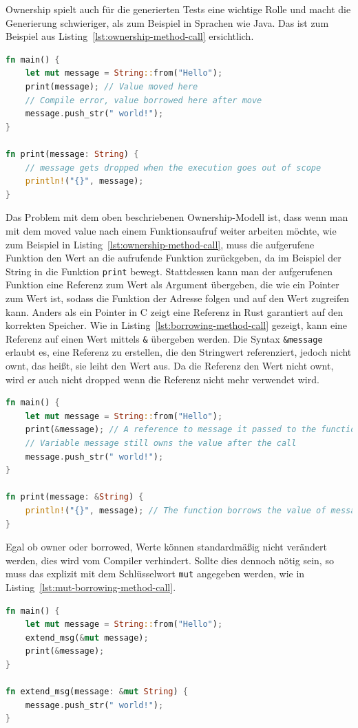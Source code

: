 \documentclass{article}
\begin{document}
Ownership spielt auch für die generierten Tests eine wichtige Rolle und macht die Generierung schwieriger, als zum Beispiel in Sprachen wie Java. Das ist zum Beispiel aus Listing~\ref{lst:ownership-method-call} ersichtlich.
\begin{lstlisting}[language=Rust, style=boxed, caption=Transferring the ownership to a method, label=lst:ownership-method-call]
fn main() {
    let mut message = String::from("Hello");
    print(message); // Value moved here
    // Compile error, value borrowed here after move
    message.push_str(" world!"); 
}

fn print(message: String) {
    // message gets dropped when the execution goes out of scope
    println!("{}", message); 
}
\end{lstlisting}

Das Problem mit dem oben beschriebenen Ownership-Modell ist, dass wenn man mit dem moved value nach einem Funktionsaufruf weiter arbeiten möchte, wie zum Beispiel in Listing~\ref{lst:ownership-method-call}, muss die aufgerufene Funktion den Wert an die aufrufende Funktion zurückgeben, da im Beispiel der String in die Funktion \lstinline{print} bewegt. Stattdessen kann man der aufgerufenen Funktion eine Referenz zum Wert als Argument übergeben, die wie ein Pointer zum Wert ist, sodass die Funktion der Adresse folgen und auf den Wert zugreifen kann. Anders als ein Pointer in C zeigt eine Referenz in Rust garantiert auf den korrekten Speicher. Wie in Listing~\ref{lst:borrowing-method-call} gezeigt, kann eine Referenz auf einen Wert mittels \lstinline{&} übergeben werden. Die Syntax \lstinline{&message} erlaubt es, eine Referenz zu erstellen, die den Stringwert referenziert, jedoch nicht ownt, das heißt, sie leiht den Wert aus. Da die Referenz den Wert nicht ownt, wird er auch nicht dropped wenn die Referenz nicht mehr verwendet wird.

\begin{lstlisting}[language=Rust, style=boxed, caption=Transferring the ownership to a method, label=lst:borrowing-method-call]
fn main() {
    let mut message = String::from("Hello");
    print(&message); // A reference to message it passed to the function call
    // Variable message still owns the value after the call
    message.push_str(" world!"); 
}

fn print(message: &String) {
    println!("{}", message); // The function borrows the value of message
}
\end{lstlisting}

Egal ob owner oder borrowed, Werte können standardmäßig nicht verändert werden, dies wird vom Compiler verhindert. Sollte dies dennoch nötig sein, so muss das explizit mit dem Schlüsselwort \lstinline{mut} angegeben werden, wie in Listing~\ref{lst:mut-borrowing-method-call}.
\begin{lstlisting}[language=Rust, style=boxed, caption=Transferring the ownership to a method, label=lst:mut-borrowing-method-call]
fn main() {
    let mut message = String::from("Hello");
    extend_msg(&mut message);
    print(&message);
}

fn extend_msg(message: &mut String) {
    message.push_str(" world!");
}
\end{lstlisting}
\end{document}
